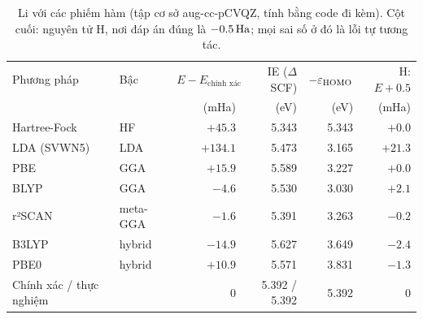 \begin{table}[h]
\centering\small
\caption{Li với các phiếm hàm (tập cơ sở aug-cc-pCVQZ, tính bằng code đi kèm). Cột cuối: nguyên tử H, nơi đáp án đúng là $-0.5\,\mathrm{Ha}$; mọi sai số ở đó là lỗi tự tương tác.}
\label{tab:dft}
\begin{tabular}{@{}llrrrr@{}}
\toprule
Phương pháp & Bậc & $E-E_{\text{chính xác}}$ & IE ($\Delta$SCF) & $-\varepsilon_{\rm HOMO}$ & H: $E+0.5$ \\
 & & (mHa) & (eV) & (eV) & (mHa) \\
\midrule
Hartree-Fock & HF & $+45.3$ & 5.343 & 5.343 & $+0.0$ \\
LDA (SVWN5) & LDA & $+134.1$ & 5.473 & 3.165 & $+21.3$ \\
PBE & GGA & $+15.9$ & 5.589 & 3.227 & $+0.0$ \\
BLYP & GGA & $-4.6$ & 5.530 & 3.030 & $+2.1$ \\
r²SCAN & meta-GGA & $-1.6$ & 5.391 & 3.263 & $-0.2$ \\
B3LYP & hybrid & $-14.9$ & 5.627 & 3.649 & $-2.4$ \\
PBE0 & hybrid & $+10.9$ & 5.571 & 3.831 & $-1.3$ \\
\midrule
Chính xác / thực nghiệm & & 0 & 5.392 / 5.392 & 5.392 & 0 \\
\bottomrule
\end{tabular}
\end{table}
